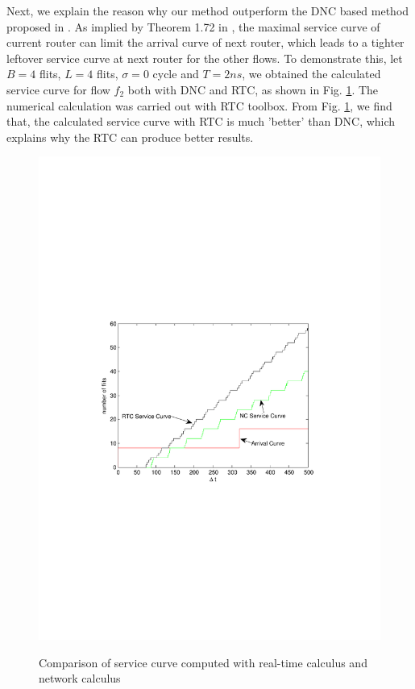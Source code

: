 \documentclass[10pt,journal]{IEEEtran}
\begin{document}
Next, we explain the reason why our method outperform the DNC based method proposed in \cite{Qian489900}. As implied by Theorem 1.72 in \cite{Boudec2001Network}, the maximal service curve of current router can limit the arrival curve of next router, which leads to a tighter leftover service curve at next router for the other flows. To demonstrate this, let $B=4$ flits, $L=4$ flits, $\sigma=0$ cycle and $T=2ns$, we obtained the calculated service curve for flow $f_2$ both with DNC and RTC, as shown in Fig. \ref{loose}. The numerical calculation was carried out with RTC toolbox. From Fig. \ref{loose}, we find that, the calculated service curve with RTC is much 'better' than DNC, which explains why the RTC can produce better results.
\begin{figure}
  \centering
  \includegraphics[scale=0.6]{figures/loose.pdf}\\
  \caption{Comparison of service curve computed with real-time calculus and network calculus}\label{loose}
\end{figure}
\end{document}
